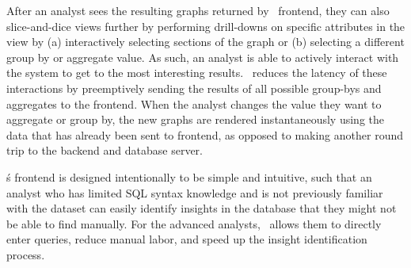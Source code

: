 After an analyst sees the resulting graphs returned by \SeeDB\ frontend, they can also slice-and-dice views further by performing drill-downs on specific attributes in the view by (a) interactively selecting sections of the graph or (b) selecting a different group by or aggregate value. As such, an analyst is able to actively interact with the system to get to the most interesting results. \SeeDB\ reduces the latency of these interactions by preemptively sending the results of all possible group-bys and aggregates to the frontend. When the analyst changes the value they want to aggregate or group by, the new graphs are rendered instantaneously using the data that has already been sent to frontend, as opposed to making another round trip to the backend and database server.

\SeeDB\'s frontend is designed intentionally to be simple and intuitive, such that an analyst who has limited SQL syntax knowledge and is not previously familiar with the dataset can easily identify insights in the database that they might not be able to find manually. For the advanced analysts, \SeeDB\ allows them to directly enter queries, reduce manual labor, and speed up the insight identification process.


